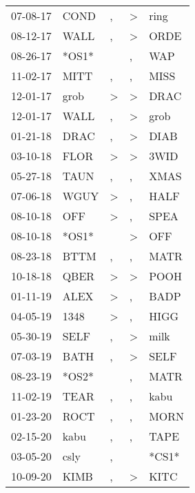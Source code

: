 \begin{supertabular}{lllll}
 07-08-17 &   COND &                , &  \textgreater &   ring \\
 08-12-17 &   WALL &                , &  \textgreater &   ORDE \\
 08-26-17 &  *OS1* &                  &             , &    WAP \\
 11-02-17 &   MITT &                , &             , &   MISS \\
 12-01-17 &   grob &     \textgreater &  \textgreater &   DRAC \\
 12-01-17 &   WALL &                , &  \textgreater &   grob \\
 01-21-18 &   DRAC &                , &  \textgreater &   DIAB \\
 03-10-18 &   FLOR &     \textgreater &  \textgreater &   3WID \\
 05-27-18 &   TAUN &                , &             , &   XMAS \\
 07-06-18 &   WGUY &     \textgreater &             , &   HALF \\
 08-10-18 &    OFF &     \textgreater &             , &   SPEA \\
 08-10-18 &  *OS1* &                  &  \textgreater &    OFF \\
 08-23-18 &   BTTM &                , &             , &   MATR \\
 10-18-18 &   QBER &     \textgreater &  \textgreater &   POOH \\
 01-11-19 &   ALEX &     \textgreater &             , &   BADP \\
 04-05-19 &   1348 &     \textgreater &             , &   HIGG \\
 05-30-19 &   SELF &                , &  \textgreater &   milk \\
 07-03-19 &   BATH &                , &  \textgreater &   SELF \\
 08-23-19 &  *OS2* &                  &             , &   MATR \\
 11-02-19 &   TEAR &                , &             , &   kabu \\
 01-23-20 &   ROCT &                , &             , &   MORN \\
 02-15-20 &   kabu &                , &             , &   TAPE \\
 03-05-20 &   csly &                , &               &  *CS1* \\
 10-09-20 &   KIMB &                , &  \textgreater &   KITC \\
\end{supertabular}
